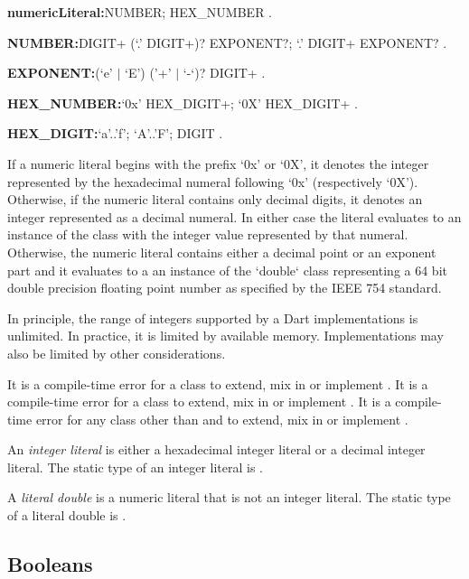 \documentclass{article}
\begin{document}
\begin{grammar}
{\bf numericLiteral:}NUMBER;
  HEX\_NUMBER
  .

{\bf NUMBER:}DIGIT+ (`{\escapegrammar.}' DIGIT+)? EXPONENT?;
  {`\escapegrammar .}' DIGIT+ EXPONENT?
  .

{\bf EXPONENT:}(`e' $|$ `E') ('+' $|$ `-`)? DIGIT+
  .

{\bf HEX\_NUMBER:}`0x' HEX\_DIGIT+;
  `0X' HEX\_DIGIT+
  .

{\bf HEX\_DIGIT:}`a'{\escapegrammar ..}'f';
  `A'{\escapegrammar ..}'F';
  DIGIT
  .
\end{grammar}

\LMHash{}
If a numeric literal begins with the prefix `0x' or `0X',
it denotes the integer represented by the hexadecimal numeral
following `0x' (respectively `0X').
Otherwise, if the numeric literal contains only decimal digits,
it denotes an integer represented as a decimal numeral.
In either case the literal evaluates to an instance of the class 
with the integer value represented by that numeral.
Otherwise, the numeric literal contains either a decimal point or an exponent part
and it evaluates to a an instance of the `double` class
representing a 64 bit double precision floating point number
as specified by the IEEE 754 standard.

\LMHash{}
In principle, the range of integers supported by a Dart implementations is unlimited.
In practice, it is limited by available memory.
Implementations may also be limited by other considerations.


\LMHash{}
It is a compile-time error for a class to extend, mix in or implement .
It is a compile-time error for a class to extend, mix in or implement .
It is a compile-time error for any class other than  and  to extend, mix in or implement .

\LMHash{}
An {\em integer literal} is either a hexadecimal integer literal or a decimal integer literal.
The static type of an integer literal is .

\LMHash{}
A {\em literal double} is a numeric literal that is not an integer literal.
The static type of a literal double is .


\subsection{Booleans}
\end{document}
